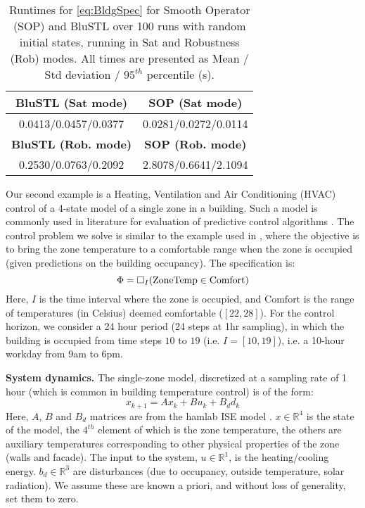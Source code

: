 \begin{table}[t]
	\begin{center}
		\caption{{\small Runtimes for \eqref{eq:BldgSpec} for Smooth Operator (SOP) and BluSTL over 100 runs with random initial states, running in Sat and Robustness (Rob) modes. All times are presented as Mean / Std deviation / $95^{th}$ percentile (s)}.}
		\vspace{-5pt}
		\label{tbl:bldg}
		\begin{tabular} {|c|c|}
			\hline
			\textbf{BluSTL (Sat mode)} &   \textbf{SOP (Sat mode)}
			\\ \hline
			0.0413/0.0457/0.0377 & 0.0281/0.0272/0.0114
			\\ \hline
			 \textbf{BluSTL (Rob. mode)} & \textbf{SOP (Rob. mode)}
			\\ \hline
			 0.2530/0.0763/0.2092 & 2.8078/0.6641/2.1094\\ \hline	
		\end{tabular}	
	\end{center}
	\vspace{-10pt}
\end{table}
Our second example is a Heating, Ventilation and Air Conditioning (HVAC) control of a 4-state model of a single zone in a building. 
Such a model is commonly used in literature for evaluation of predictive control algorithms \cite{Jain2016}. 
The control problem we solve is similar to the example used in \cite{Raman14_MPCSTL}, where the objective is to bring the zone temperature to a comfortable range when the zone is occupied (given predictions on the building occupancy). 
The specification is:
\begin{equation}
\label{eq:BldgSpec}
\Phi= \square_I(\text{ZoneTemp} \in \text{Comfort})
\end{equation}
Here, $I$ is the time interval where the zone is occupied, and $\text{Comfort}$ is the range of temperatures (in Celsius) deemed comfortable ($[22,28]$). For the control horizon, we consider a 24 hour period (24 steps at 1hr sampling), in which the building is occupied from time steps $10$ to $19$ (i.e. $I=[10,19]$), i.e. a 10-hour workday from 9am to 6pm. 

\textbf{System dynamics.} The single-zone model, discretized at a sampling rate of 1 hour (which is common in building temperature control) is of the form:
\begin{equation}
\label{eq:bldg_dyn}
x_{k+1} = Ax_{k}+Bu_k+B_dd_k
\end{equation}
Here, $A$, $B$ and $B_d$ matrices are from the hamlab ISE model \cite{VanSchijndel2005}. $x \in \mathbb{R}^4$ is the state of the model, the $4^{th}$ element of which is the zone temperature, the others are auxiliary temperatures corresponding to other physical properties of the zone (walls and facade). 
The input to the system, $u \in \mathbb{R}^1$, is the heating/cooling energy. 
$b_d \in \mathbb{R}^3$ are disturbances (due to occupancy, outside temperature, solar radiation). 
We assume these are known a priori, and without loss of generality, set them to zero.

